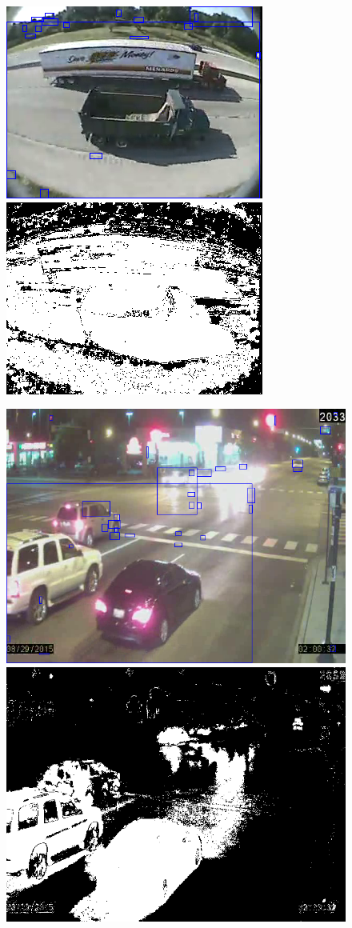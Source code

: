\begin{figure}[!htbp]
\centering
    \begin{minipage}{0.9\columnwidth}
        \includegraphics[width=0.48\linewidth, height = 0.3\linewidth]{./img/bg/252707.png}
        \includegraphics[width=0.48\linewidth, height = 0.3\linewidth]{./img/bg/252707_FG.png}
        \label{subfig:bg-autoExposure}
    \end{minipage}
    \hspace{0.02\columnwidth}
    \begin{minipage}{0.9\columnwidth}
        \includegraphics[width=0.48\linewidth, height = 0.3\linewidth]{./img/bg/ciceroPeterson.png}
        \includegraphics[width=0.48\linewidth, height = 0.3\linewidth]{./img/bg/ciceroPeterson_FG.png}
        \label{subfig:bg-illuminationChange}

\end{minipage}
\end{figure}
